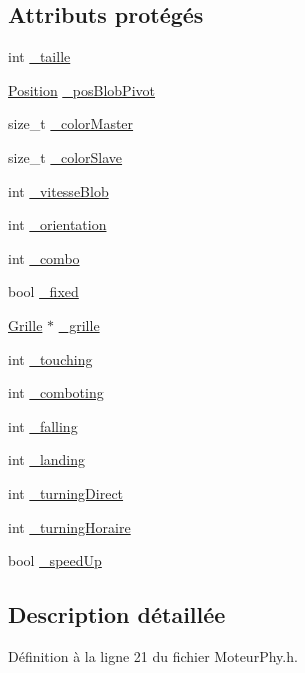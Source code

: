 \subsection*{Attributs protégés}
\begin{DoxyCompactItemize}
\item 
int \hyperlink{a00013_a3c1e76cb12396ae57a40340decf3502a}{\_\-taille}
\item 
\hyperlink{a00014}{Position} \hyperlink{a00013_adea2f52929d858754cc5b47fe9048851}{\_\-posBlobPivot}
\item 
size\_\-t \hyperlink{a00013_a9d4e37ce23b4789f20fffd11e5eafdf5}{\_\-colorMaster}
\item 
size\_\-t \hyperlink{a00013_a70abfbed5e6126f443c721d185f04952}{\_\-colorSlave}
\item 
int \hyperlink{a00013_adddea379291ef88ec19e7cc8f6dc13c8}{\_\-vitesseBlob}
\item 
int \hyperlink{a00013_a00fd8bca4af06999915a03b221d06141}{\_\-orientation}
\item 
int \hyperlink{a00013_ac03396a1d6630aab8e1124f140ec0209}{\_\-combo}
\item 
bool \hyperlink{a00013_a017cb4047a99eb1d77a00b809dddb316}{\_\-fixed}
\item 
\hyperlink{a00009}{Grille} $\ast$ \hyperlink{a00013_adb5aaa4c6afc40fb635dab1ae6903bab}{\_\-grille}
\item 
int \hyperlink{a00013_a9e294d1d8102ce049a8433f1a1e4f2d8}{\_\-touching}
\item 
int \hyperlink{a00013_af24fab45cd725cba2bc90d04c45d455f}{\_\-comboting}
\item 
int \hyperlink{a00013_acc1309c3ba878730a3767d3d06c6f632}{\_\-falling}
\item 
int \hyperlink{a00013_ae60dc40b758975f2259c162647f934b3}{\_\-landing}
\item 
int \hyperlink{a00013_ae1c1702bbaa2ecae65150c4af9b1712a}{\_\-turningDirect}
\item 
int \hyperlink{a00013_a1a8ace56710143ada31add1aaa159f26}{\_\-turningHoraire}
\item 
bool \hyperlink{a00013_a2d83ff8a47ad2b92fea4514886bc80e2}{\_\-speedUp}
\end{DoxyCompactItemize}


\subsection{Description détaillée}


Définition à la ligne 21 du fichier MoteurPhy.h.



